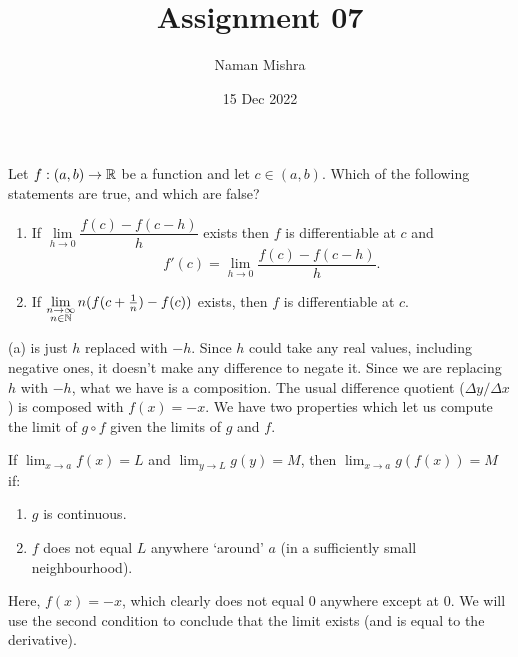 \documentclass[12pt]{article}
\title{Assignment 07}
\author{Naman Mishra}
\date{15 Dec 2022}
\begin{document}
\maketitle

\begin{problem}
    Let $f : (a, b) \to \mathbb{R}$ be a function and let $c \in (a, b)$.
    Which of the following statements are true, and which are false?
    \begin{enumerate}[label=(\alph*)]
        \item If $\lim\limits_{h \to 0} \dfrac{f(c) - f(c - h)}{h}$ exists then $f$ is differentiable at $c$ and \[
                f'(c) = \lim\limits_{h \to 0} \dfrac{f(c) - f(c - h)}{h}.
            \]
        \item If $\lim\limits_{\substack{n \to \infty \\ n \in \mathbb{N}}} n (f( c + \frac{1}{n}) - f(c))$ exists, then $f$ is differentiable at $c$.
    \end{enumerate}
\end{problem}
(a) is just $h$ replaced with $-h$.
Since $h$ could take any real values, including negative ones, it doesn't make any difference to negate it.
Since we are replacing $h$ with $-h$, what we have is a composition.
The usual difference quotient ($\Delta y / \Delta x$) is composed with $f(x) = -x$.
We have two properties which let us compute the limit of $g \circ f$ given the limits of $g$ and $f$.

If $\lim_{x \to a} f(x) = L$ and $\lim_{y \to L} g(y) = M$, then $\lim_{x \to a} g(f(x)) = M$ if:
\begin{enumerate}[label=(\roman*)]
    \item $g$ is continuous.
    \item $f$ does not equal $L$ anywhere `around' $a$ (in a sufficiently small neighbourhood).
\end{enumerate}
Here, $f(x) = -x$, which clearly does not equal 0 anywhere except at 0. We will use the second condition to conclude that the limit exists (and is equal to the derivative).
\end{document}

